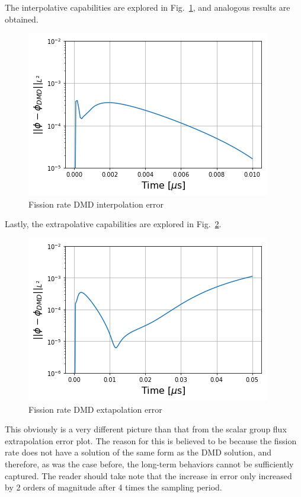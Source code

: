 \documentclass{style/nseJournal}
\newcommand{\LFI}[1]{\label{fi:#1}}
\newcommand{\FI}[1]{Fig.~\ref{fi:#1}}
\newcommand{\bfg}{\begin{figure}}
\newcommand{\efg}{\end{figure}}
\begin{document}
The interpolative capabilities are explored in \FI{interp-fis}, and analogous results are obtained.
\bfg[!htb] \centering
	\includegraphics[scale=0.5]{figures/fission_interp_error.png}
	\caption{Fission rate DMD interpolation error}
	\LFI{interp-fis}
\efg
Lastly, the extrapolative capabilities are explored in \FI{extrap-fis}. 
\bfg[t] \centering
	\includegraphics[scale=0.5]{figures/fission_extrap_error.png}
	\caption{Fission rate DMD extapolation error}
	\LFI{extrap-fis}
\efg
This obviously is a very different picture than that from the scalar group flux extrapolation error plot.  
The reason for this is believed to be because the fission rate does not have a solution of the same form as the DMD solution, and therefore, as was the case before, the long-term behaviors cannot be sufficiently captured.  
The reader should take note that the increase in error only increased by 2 orders of magnitude after 4 times the sampling period.  
\end{document}
